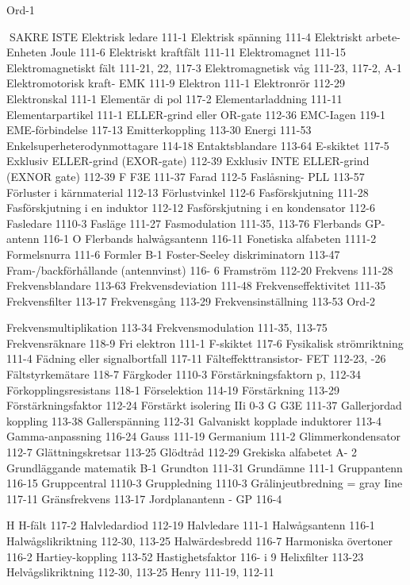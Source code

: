 Ord-1

SAKRE ISTE
Elektrisk ledare 111-1
Elektrisk spänning 111-4
Elektriskt arbete- Enheten Joule 111-6
Elektriskt kraftfält 111-11
Elektromagnet 111-15
Elektromagnetiskt fält 111-21, 22, 117-3
Elektromagnetisk våg 111-23, 117-2, A-1
Elektromotorisk kraft- EMK 111-9
Elektron 111-1
Elektronrör 112-29
Elektronskal 111-1
Elementär di pol 117-2
Elementarladdning 111-11
Elementarpartikel 111-1
ELLER-grind eller OR-gate 112-36
EMC-Iagen 119-1
EME-förbindelse 117-13
Emitterkoppling 113-30
Energi 111-53
Enkelsuperheterodynmottagare 114-18
Entaktsblandare 113-64
E-skiktet 117-5
Exklusiv ELLER-grind (EXOR-gate) 112-39
Exklusiv INTE ELLER-grind (EXNOR gate)
112-39
F
F3E 111-37
Farad 112-5
Faslåsning- PLL 113-57
Förluster i kärnmaterial 112-13
Förlustvinkel 112-6
Fasförskjutning 111-28
Fasförskjutning i en induktor 112-12
Fasförskjutning i en kondensator 112-6
Fasledare 1110-3
Fasläge 111-27
Fasmodulation 111-35, 113-76
Flerbands GP-antenn 116-1 O
Flerbands halwågsantenn 116-11
Fonetiska alfabeten 1111-2
Formelsnurra 111-6
Formler B-1
Foster-Seeley diskriminatorn 113-47
Fram-/backförhållande (antennvinst) 116- 6
Framström 112-20
Frekvens 111-28
Frekvensblandare 113-63
Frekvensdeviation 111-48
Frekvenseffektivitet 111-35
Frekvensfilter 113-17
Frekvensgång 113-29
Frekvensinställning 113-53
Ord-2

Frekvensmultiplikation 113-34
Frekvensmodulation 111-35, 113-75
Frekvensräknare 118-9
Fri elektron 111-1
F-skiktet 117-6
Fysikalisk strömriktning 111-4
Fädning eller signalbortfall 117-11
Fälteffekttransistor- FET 112-23, -26
Fältstyrkemätare 118-7
Färgkoder 1110-3
Förstärkningsfaktorn p, 112-34
Förkopplingsresistans 118-1
Förselektion 114-19
Förstärkning 113-29
Förstärkningsfaktor 112-24
Förstärkt isolering IIi 0-3
G
G3E 111-37
Gallerjordad koppling 113-38
Gallerspänning 112-31
Galvaniskt kopplade induktorer 113-4
Gamma-anpassning 116-24
Gauss 111-19
Germanium 111-2
Glimmerkondensator 112-7
Glättningskretsar 113-25
Glödtråd 112-29
Grekiska alfabetet A- 2
Grundläggande matematik B-1
Grundton 111-31
Grundämne 111-1
Gruppantenn 116-15
Gruppcentral 1110-3
Gruppledning 1110-3
Grålinjeutbredning = gray Iine 117-11
Gränsfrekvens 113-17
Jordplanantenn - GP 116-4

H
H-fält 117-2
Halvledardiod 112-19
Halvledare 111-1
Halwågsantenn 116-1
Halwågslikriktning 112-30, 113-25
Halwärdesbredd 116-7
Harmoniska övertoner 116-2
Hartiey-koppling 113-52
Hastighetsfaktor 116- i 9
Helixfilter 113-23
Helvågslikriktning 112-30, 113-25
Henry 111-19, 112-11

